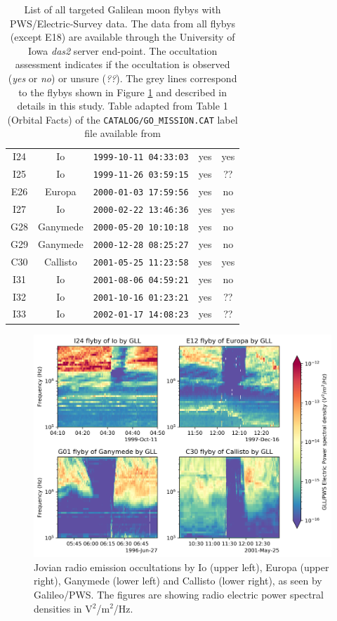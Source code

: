\documentclass[referee]{aa}
\begin{document}
\begin{table}[]
\begin{tabular}{c|c|c|c|c}
\rowcolor{LightGray}
I24 & Io       & \texttt{1999-10-11 04:33:03} & yes & yes \\
I25 & Io       & \texttt{1999-11-26 03:59:15} & yes & ??  \\
E26 & Europa   & \texttt{2000-01-03 17:59:56} & yes & no  \\
I27 & Io       & \texttt{2000-02-22 13:46:36} & yes & yes \\
G28 & Ganymede & \texttt{2000-05-20 10:10:18} & yes & no  \\
G29 & Ganymede & \texttt{2000-12-28 08:25:27} & yes & no  \\
\rowcolor{LightGray}
C30 & Callisto & \texttt{2001-05-25 11:23:58} & yes & yes \\
I31 & Io       & \texttt{2001-08-06 04:59:21} & yes & no  \\
I32 & Io       & \texttt{2001-10-16 01:23:21} & yes & ??  \\
I33 & Io       & \texttt{2002-01-17 14:08:23} & yes & ??
\end{tabular}
    \caption{List of all targeted Galilean moon flybys with PWS/Electric-Survey data. The data from all flybys (except E18) are available through the University of Iowa \emph{das2} server end-point. The occultation assessment indicates if the occultation is observed (\emph{yes} or \emph{no}) or unsure (\emph{??}). The grey lines correspond to the flybys shown in Figure \ref{fig:flyby_data} and described in details in this study. Table adapted from Table 1 (Orbital Facts) of the \texttt{CATALOG/GO\_MISSION.CAT} label file available from \citet{PWS_LPW_PDS}}
    \label{tab:gll-flyby-list}
\end{table}


\begin{figure}
    \centering
    \includegraphics[width=1.0\linewidth]{Moon_flyby_galileo_occultation_data.png}
    \caption{Jovian radio emission occultations by Io (upper left), Europa (upper right), Ganymede (lower left) and Callisto (lower right), as seen by Galileo/PWS. The figures are showing radio electric power spectral densities in V$^2$/m$^2$/Hz.}
    \label{fig:flyby_data}
\end{figure}
\end{document}
